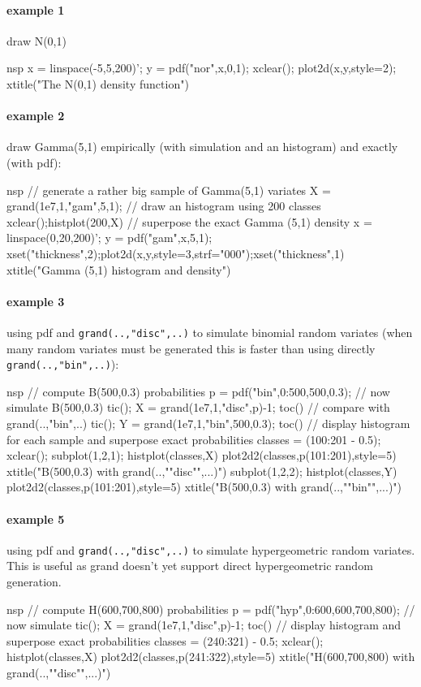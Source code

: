 \begin{examples}
  
\paragraph{example 1} draw N(0,1) 
\begin{mintednsp}{nsp}
x = linspace(-5,5,200)';
y = pdf("nor",x,0,1);
xclear(); plot2d(x,y,style=2);
xtitle("The N(0,1) density function")
\end{mintednsp}
  
\paragraph{example 2} draw Gamma(5,1) empirically (with simulation and
an histogram) and exactly (with pdf):
\begin{mintednsp}{nsp}
// generate a rather big sample of Gamma(5,1) variates
X = grand(1e7,1,"gam",5,1);
// draw an histogram using 200 classes
xclear();histplot(200,X)
// superpose the exact Gamma (5,1) density
x = linspace(0,20,200)';
y = pdf("gam",x,5,1);
xset("thickness",2);plot2d(x,y,style=3,strf="000");xset("thickness",1)
xtitle("Gamma (5,1) histogram and density")
\end{mintednsp}

\paragraph{example 3} using pdf and \verb+grand(..,"disc",..)+ to simulate
binomial random variates (when many random variates must be generated
this is faster than using directly \verb+grand(..,"bin",..)+):
\begin{mintednsp}{nsp}
// compute B(500,0.3) probabilities
p = pdf("bin",0:500,500,0.3);
// now simulate B(500,0.3)
tic(); X = grand(1e7,1,"disc",p)-1; toc()
// compare with grand(..,"bin",..)
tic(); Y = grand(1e7,1,"bin",500,0.3); toc()
// display histogram for each sample and superpose exact probabilities
classes = (100:201 - 0.5);
xclear();
subplot(1,2,1); histplot(classes,X)
plot2d2(classes,p(101:201),style=5)
xtitle("B(500,0.3) with grand(..,""disc"",...)")
subplot(1,2,2); histplot(classes,Y)
plot2d2(classes,p(101:201),style=5)
xtitle("B(500,0.3) with grand(..,""bin"",...)")
\end{mintednsp}

\paragraph{example 5} using pdf and \verb+grand(..,"disc",..)+ to simulate
hypergeometric random variates. This is useful as grand doesn't yet
support direct hypergeometric random generation.
\begin{mintednsp}{nsp}
// compute H(600,700,800) probabilities
p = pdf("hyp",0:600,600,700,800);
// now simulate 
tic(); X = grand(1e7,1,"disc",p)-1; toc()
// display histogram and superpose exact probabilities
classes = (240:321) - 0.5;
xclear();
histplot(classes,X)
plot2d2(classes,p(241:322),style=5)
xtitle("H(600,700,800) with grand(..,""disc"",...)")
\end{mintednsp}

\end{examples}
